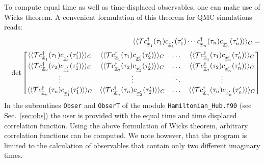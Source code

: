 To compute equal time as well as time-displaced observables,  one can make use of Wicks theorem. A convenient formulation of this theorem for  QMC simulations reads: 
\begin{eqnarray}
& & \langle \langle 	{\cal T}   c^{\dagger}_{\underline x_{1}}(\tau_{1}) c^{\phantom\dagger}_{{\underline x}'_{1}}(\tau'_{1})  
\cdots c^{\dagger}_{\underline x_{n}}(\tau_{n}) c^{\phantom\dagger}_{{\underline x}'_{n}}(\tau'_{n}) 
\rangle \rangle_{C} =
\nonumber \\ & & \det  
\begin{bmatrix}
   \langle \langle   {\cal T}   c^{\dagger}_{\underline x_{1}}(\tau_{1}) c^{\phantom\dagger}_{{\underline x}'_{1}}(\tau'_{1})  \rangle \rangle_{C} & 
    \langle \langle  {\cal T}   c^{\dagger}_{\underline x_{1}}(\tau_{1}) c^{\phantom\dagger}_{{\underline x}'_{2}}(\tau'_{2})  \rangle \rangle_{C}  & \dots   &   
    \langle \langle   {\cal T}   c^{\dagger}_{\underline x_{1}}(\tau_{1}) c^{\phantom\dagger}_{{\underline x}'_{n}}(\tau'_{n})  \rangle \rangle_{C}  \\
    \langle \langle   {\cal T}   c^{\dagger}_{\underline x_{2}}(\tau_{2}) c^{\phantom\dagger}_{{\underline x}'_{1}}(\tau'_{1})  \rangle \rangle_{C}  & 
      \langle \langle   {\cal T}   c^{\dagger}_{\underline x_{2}}(\tau_{2}) c^{\phantom\dagger}_{{\underline x}'_{2}}(\tau'_{2})  \rangle \rangle_{C}  & \dots  &
       \langle \langle   {\cal T}   c^{\dagger}_{\underline x_{2}}(\tau_{2}) c^{\phantom\dagger}_{{\underline x}'_{n}}(\tau'_{n})  \rangle \rangle_{C}   \\
    \vdots & \vdots &  \ddots & \vdots \\
    \langle \langle   {\cal T}   c^{\dagger}_{\underline x_{n}}(\tau_{n}) c^{\phantom\dagger}_{{\underline x}'_{1}}(\tau'_{1})  \rangle \rangle_{C}   & 
     \langle \langle   {\cal T}   c^{\dagger}_{\underline x_{n}}(\tau_{n}) c^{\phantom\dagger}_{{\underline x}'_{2}}(\tau'_{2})  \rangle \rangle_{C}   & \dots  & 
     \langle \langle   {\cal T}   c^{\dagger}_{\underline x_{n}}(\tau_{n}) c^{\phantom\dagger}_{{\underline x}'_{n}}(\tau'_{n})  \rangle \rangle_{C}
 \end{bmatrix}
\end{eqnarray}
In the subroutines   \texttt{Obser}  and \texttt{ObserT} of  the module \texttt{Hamiltonian\_Hub.f90} (see Sec.~\ref{sec:obs})   the user is provided with the equal time and time displaced correlation function. Using the  above  formulation  of  Wicks theorem, arbitrary  correlation functions can be computed. We note however, that the program is limited to the calculation of observables that contain only two different imaginary times.  

